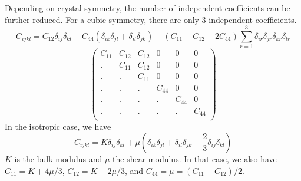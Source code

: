 Depending on crystal symmetry, the number of independent coefficients
can be further reduced.  For a cubic symmetry, there are only 3
independent coefficients.
%
\begin{equation}\label{eq:Cijkl_cubic}
  C_{ijkl}=C_{12}\delta_{ij}\delta_{kl}+C_{44}(\delta_{ik}\delta_{jl}+\delta_{il}\delta_{jk})
  + (C_{11}-C_{12}-2C_{44})\sum_{r=1}^3 \delta_{ir}\delta_{jr}\delta_{kr}\delta_{lr}
\end{equation}
%
\begin{equation}
\left(
  \begin{array}{cccccc}
    C_{11} & C_{12} & C_{12} & 0 & 0 & 0 \\
    . & C_{11} & C_{12} & 0 & 0 & 0 \\
    . & . & C_{11} & 0 & 0 & 0 \\
    . & . & . & C_{44} & 0 & 0 \\
    . & . & . & . & C_{44} & 0 \\
    . & . & . & . & . & C_{44} \\
  \end{array}
\right)
\end{equation}
%
In the isotropic case, we have
%
\begin{equation}\label{eq:Cijkl_isotropic}
  C_{ijkl}=K\delta_{ij}\delta_{kl}
    +\mu(\delta_{ik}\delta_{jl}+\delta_{il}\delta_{jk}
    -\frac{2}{3}\delta_{ij}\delta_{kl})
\end{equation}
%
$K$ is the bulk modulus and $\mu$ the shear modulus.  In that case, we
also have $C_{11}=K+4\mu/3$, $C_{12}=K-2\mu/3$, and
$C_{44}=\mu=(C_{11}-C_{12})/2$.

